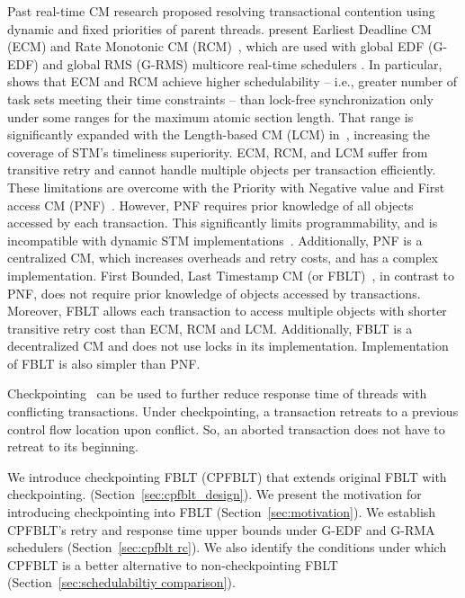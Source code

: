 \documentclass[preprint]{sigplanconf}
\begin{document}
Past real-time CM research proposed resolving transactional contention using dynamic and fixed priorities of parent threads. \cite{6045438,stmconcurrencycontrol:emsoft11,lcmdac2012} present  Earliest Deadline CM (ECM) and Rate Monotonic CM (RCM)~, which are used with global EDF (G-EDF) and global RMS (G-RMS) multicore real-time schedulers \cite{Davis:2011:SHR:1978802.1978814}.
In particular,~\cite{stmconcurrencycontrol:emsoft11} shows that ECM and RCM achieve higher schedulability -- i.e., greater number of task sets meeting their time constraints -- than lock-free synchronization only under some ranges for the maximum atomic section length. That range is significantly expanded with the Length-based CM (LCM) in~\cite{lcmdac2012}, increasing the coverage of STM's timeliness superiority. ECM, RCM, and LCM suffer from transitive retry and cannot handle multiple objects per transaction efficiently. These limitations are overcome with the Priority with Negative value and First access CM (PNF)~\cite{pnf_dac_asp,shambake_phd_proposal}. However, PNF requires prior knowledge of all objects accessed by each transaction. This significantly limits programmability, and is incompatible with dynamic STM implementations~\cite{Herlihy:2003:STM:872035.872048}. Additionally, PNF is a centralized CM, which increases overheads and retry costs, and has a complex implementation. First Bounded, Last Timestamp CM (or FBLT)~\cite{fblt}, in contrast to PNF, does not require prior knowledge of objects accessed by transactions. Moreover, FBLT allows each transaction to access multiple objects with shorter transitive retry cost than ECM, RCM and LCM. Additionally, FBLT is a decentralized CM and does not use locks in its implementation. Implementation of FBLT is also simpler than PNF.

Checkpointing~\cite{Koskinen:2008:CCI:1378533.1378563} can be used to further reduce response time of threads with conflicting transactions. Under checkpointing, a transaction retreats to a previous control flow location upon conflict. So, an aborted transaction does not have to retreat to its beginning.

We introduce checkpointing FBLT (CPFBLT) that extends original FBLT with checkpointing. (Section~\ref{sec:cpfblt_design}). We present the motivation for introducing checkpointing into FBLT (Section~\ref{sec:motivation}). We establish CPFBLT's retry and response time upper bounds under G-EDF and G-RMA schedulers (Section~\ref{sec:cpfblt rc}). We also identify the conditions under which CPFBLT is a better alternative to non-checkpointing FBLT (Section~\ref{sec:schedulabiltiy comparison}).
\end{document}
